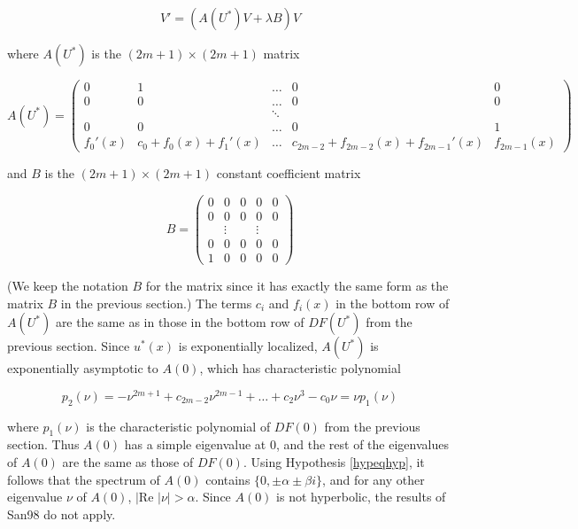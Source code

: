 \documentclass[12pt]{article}
\begin{document}
\begin{equation}\label{PDEeig2}
V' = ( A(U^*)V + \lambda B)V 
\end{equation}

where $A(U^*)$ is the $(2m+1) \times (2m+1)$ matrix

\begin{equation}\label{DefA}
A(U^*) = \begin{pmatrix}
0 & 1 & \dots & 0 & 0 \\
0 & 0 & \dots & 0 & 0 \\
& & \ddots  \\
0 & 0 & \dots & 0 & 1 \\
f_0'(x) & c_0 + f_0(x) + f_1'(x) & \dots & c_{2m-2} + f_{2m-2}(x) + f_{2m-1}' (x) & f_{2m-1}(x)
\end{pmatrix}
\end{equation}

and $B$ is the $(2m +1) \times (2m+1)$ constant coefficient matrix

\begin{equation}\label{DefB}
B = \begin{pmatrix}0 & 0 & 0 & 0 & 0 \\0 & 0 & 0 & 0 & 0 \\  & 
\vdots & & \vdots & \\0 & 0 & 0 & 0 & 0 \\1 & 0 & 0 & 0 & 0 \end{pmatrix} 
\end{equation}

(We keep the notation $B$ for the matrix since it has exactly the same form as the matrix $B$ in the previous section.) The terms $c_i$ and $f_i(x)$ in the bottom row of $A(U^*)$ are the same as in those in the bottom row of $DF(U^*)$ from the previous section. Since $u^*(x)$ is exponentially localized, $A(U^*)$ is exponentially asymptotic to $A(0)$, which has characteristic polynomial

\begin{equation}\label{charpolyA0}
p_2(\nu) = -\nu^{2m+1} + c_{2m-2} \nu^{2m-1} + \dots + c_2 \nu^3 - c_0 \nu = \nu p_1(\nu)
\end{equation}

where $p_1(\nu)$ is the characteristic polynomial of $DF(0)$ from the previous section. Thus $A(0)$ has a simple eigenvalue at 0, and the rest of the eigenvalues of $A(0)$ are the same as those of $DF(0)$. Using Hypothesis \ref{hypeqhyp}, it follows that the spectrum of $A(0)$ contains $\{ 0, \pm \alpha \pm \beta i\}$, and for any other eigenvalue $\nu$ of $A(0)$, $|\text{Re }|\nu| > \alpha$. Since $A(0)$ is not hyperbolic, the results of San98 do not apply.\\
\end{document}
